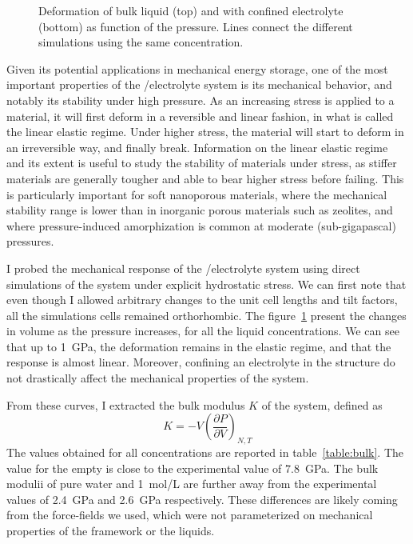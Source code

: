 \documentclass[thesis]{subfiles}
\begin{document}
\begin{figure}[ht]
    \centering
    
    \caption{Deformation of bulk liquid (top) and  with confined electrolyte
    (bottom) as function of the pressure. Lines connect the different simulations
    using the same concentration.}
    \label{fig:licl-zif:pv}
\end{figure}

Given its potential applications in mechanical energy storage, one of the most
important properties of the /electrolyte system is its mechanical behavior,
and notably its stability under high pressure. As an increasing stress is
applied to a material, it will first deform in a reversible and linear fashion,
in what is called the linear elastic regime. Under higher stress, the
material will start to deform in an irreversible way, and finally break.
Information on the linear elastic regime and its extent is useful to study the
stability of materials under stress, as stiffer materials are generally tougher
and able to bear higher stress before failing. This is particularly important
for soft nanoporous materials, where the mechanical stability range is lower
than in inorganic porous materials such as zeolites, and where pressure-induced
amorphization is common at moderate (sub-gigapascal)
pressures\cite{Bennett2011, Cao2012, AOrtiz2013}.

I probed the mechanical response of the /electrolyte system using direct
simulations of the system under explicit hydrostatic stress. We can first note
that even though I allowed arbitrary changes to the unit cell lengths and tilt
factors, all the simulations cells remained orthorhombic. The
figure~\ref{fig:licl-zif:pv} present the changes in volume as the pressure
increases, for all the liquid concentrations. We can see that up to \SI{1}{GPa},
the deformation remains in the elastic regime, and that the response is almost
linear. Moreover, confining an electrolyte in the  structure do not
drastically affect the mechanical properties of the system.

From these curves, I extracted the bulk modulus $K$ of the system, defined as
\[K = -V\left(\frac{\partial P}{\partial V}\right)_{N,T}\]
The values obtained for all concentrations are reported in
table~\ref{table:bulk}. The value for the empty  is close to the
experimental\cite{Tan2012} value of \SI{7.8}{GPa}. The bulk modulii of pure
water and \SI{1}{mol/L} are further away from the experimental
values\cite{Lanman1934} of \SI{2.4}{GPa} and \SI{2.6}{GPa} respectively. These
differences are likely coming from the force-fields we used, which were not
parameterized on mechanical properties of the framework or the liquids.
\end{document}
